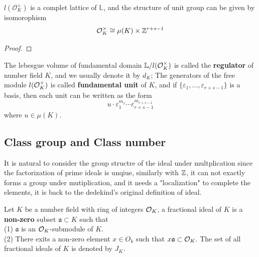 \begin{colortheorem}[Dirichlet]
    \(l(\mathcal{O}_K^\times)\) is a complet lattice of \(\mathbb{L}\), and the structure of unit group can be given by isomorophism
    \[\mathcal{O}_K^\times \cong \mu(K) \times \mathbb{Z}^{r+s - 1}\]
\end{colortheorem}

\begin{proof}
    
\end{proof}

The lebesgue volume of fundamental domain \(\mathbb{L}/ l(\mathcal{O}_K^\times)\) is called the \textbf{regulator} of number field \(K\), and we usually denote it by \(d_K\); The generators of the free module \(l(\mathcal{O}_K^\times)\) is called \textbf{fundamental unit} of \(K\), and if \(\{\varepsilon_1,\dots,\varepsilon_{r+s-1}\}\) is a basis, then each unit can be written as the form 
\[u \cdot \varepsilon_1^{m_1} \cdots \varepsilon_{r+s-1}^{m_{r+s-1}}\]
where \(u \in \mu(K)\).

    \newpage
    \subsection{Class group and Class number}

It is natural to consider the group structre of the ideal under multplication since the factorization of prime ideals is unqiue, similarly with \(\mathbb{Z}\), it can not exactly forms a group under mutiplication, and it needs a "localization" to complete the elements, it is back to the dedekind's original definition of ideal.

\begin{definition}
    Let \(K\) be a number field with ring of integers \(\mathcal{O}_K\), a fractional ideal of \(K\) is a \textbf{non-zero} subset \(\mathfrak{a} \subset K\) such that\\
    (1) \(\mathfrak{a}\) is an \(\mathcal{O}_K\)-submodule of \(K\).\\
    (2) There exits a non-zero element \(x \in O_k\) such that \(x \mathfrak{a} \subset \mathcal{O}_K\).
    The set of all fractional ideals of \(K\) is denoted by \(J_K\).
\end{definition}

